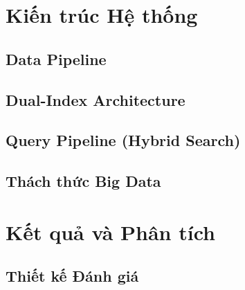 \documentclass[letterpaper,12pt]{report}
\begin{document}
\chapter{Kiến trúc Hệ thống}

\section{Data Pipeline}

\section{Dual-Index Architecture}

\section{Query Pipeline (Hybrid Search)}

\section{Thách thức Big Data}

\chapter{Kết quả và Phân tích}

\section{Thiết kế Đánh giá}
\end{document}
